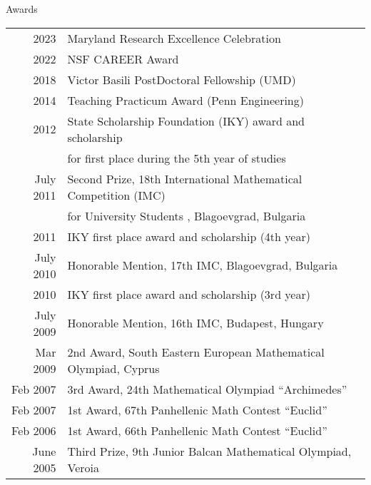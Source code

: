 \documentclass{resume} %
\begin{document}

\begin{rSection}{Awards}

  \begin{longtable}{rl}
  2023 & Maryland Research Excellence Celebration\\
  2022 & NSF CAREER Award \\
  2018 & Victor Basili PostDoctoral Fellowship (UMD)\\
  2014	 & Teaching Practicum Award (Penn Engineering) \\
  2012 & State Scholarship Foundation (IKY) award and scholarship \\
       & for first place during the 5th year of studies \\
  July  2011  &  Second  Prize,  18th  International Mathematical Competition (IMC) \\
  &  for University Students , Blagoevgrad, Bulgaria \\
  2011 & IKY first place award and scholarship (4th year)\\
  July 2010 &  Honorable Mention,  17th IMC, Blagoevgrad, Bulgaria \\
  2010 & IKY first place award and scholarship (3rd year)\\
  July 2009 &  Honorable Mention,  16th IMC, Budapest, Hungary\\
  Mar 2009  &  2nd Award, South Eastern European Mathematical Olympiad, Cyprus\\

  Feb 2007 &  3rd Award, 24th Mathematical Olympiad “Archimedes”\\
  Feb 2007 &  1st Award, 67th Panhellenic Math Contest “Euclid”\\
  Feb 2006 &  1st Award, 66th Panhellenic Math Contest “Euclid”\\
  June 2005 &  Third Prize, 9th Junior Balcan Mathematical Olympiad, Veroia\\
  

\end{longtable}
\end{rSection}
\end{document}
